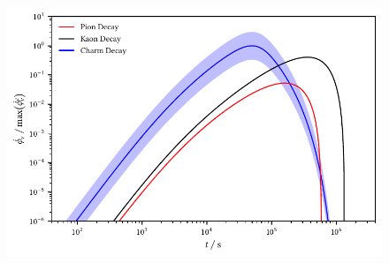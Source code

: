 \begin{figure}[H]
	\centering
	\includegraphics{../plots/build/magnetar_neutrino_spectrum_without.pdf}
	\caption[]{}
	\label{fig:magnetar-flux-without}
\end{figure}
